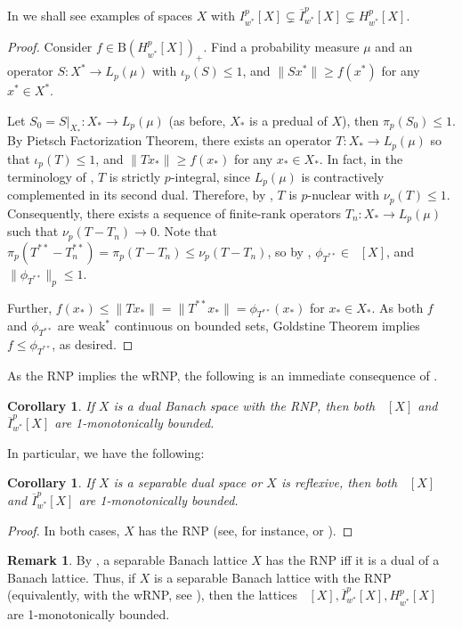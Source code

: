 \documentclass{amsart}
\theoremstyle{plain}
\newtheorem{corollary}[theorem]{Corollary}
\theoremstyle{definition}
\newtheorem{remark}[theorem]{Remark}
\numberwithin{equation}{section}
\newcommand{\ball}{\mathrm{B}}
\DeclareMathOperator{\FBLp}{FBL^{\mathit{(p)}}}
\newcommand{\Hp}{H_{w^*}^{p}}
\newcommand{\nip}{I_{w^*}^{p}}
\newcommand{\Ip}{\overline{I}_{w^*}^{p}}
\begin{document}
In  we shall see examples of spaces $X$ with $\nip[X] \subsetneq \Ip[X] \subsetneq \Hp[X]$.

\begin{proof}
 Consider $f \in \ball(\Hp[X])_+$. Find a probability measure $\mu$ and an operator $S : X^* \to L_p(\mu)$ with $\iota_p(S) \leq 1$, and $\|S x^*\| \geq f(x^*)$ for any $x^* \in X^*$.
 
 Let $S_0 = S|_{X_*} : X_* \to L_p(\mu)$ (as before, $X_*$ is a predual of $X$), then $\pi_p(S_0) \leq 1$. By Pietsch Factorization Theorem, there exists an operator $T : X_* \to L_p(\mu)$ so that $\iota_p(T) \leq 1$, and $\|Tx_*\| \geq f(x_*)$ for any $x_* \in X_*$. In fact, in the terminology of \cite{Car}, $T$ is strictly $p$-integral, since $L_p(\mu)$ is contractively complemented in its second dual. 
 Therefore, by \cite[Theorem II.4]{Car}, $T$ is $p$-nuclear with $\nu_p(T) \leq 1$. Consequently, there exists a sequence of finite-rank operators $T_n: X_* \to L_p(\mu)$ such that $\nu_p(T - T_n) \to 0$. Note that $\pi_p(T^{**} - T_n^{**}) = \pi_p(T - T_n) \leq \nu_p(T - T_n)$, so by , $\phi_{T^{**}} \in \FBLp[X]$, and $\|\phi_{T^{**}}\|_p \leq 1$.
 
  Further, $f(x_*) \leq \|T x_*\| = \|T^{**} x_*\| = \phi_{T^{**}}(x_*)$ for $x_* \in X_*$. As both $f$ and $\phi_{T^{**}}$ are weak$^*$ continuous on bounded sets, Goldstine Theorem implies $f \leq \phi_{T^{**}}$, as desired.
\end{proof}

As the RNP implies  the wRNP, the following is an immediate consequence of .
\begin{corollary}\label{dual-with-RNP}
 If $X$ is a dual Banach space with the RNP, then both $\FBLp[X]$ and $\Ip[X]$ are 1-monotonically bounded.
\end{corollary}

In particular, we have the following:

\begin{corollary}\label{good cases}
If $X$ is a separable dual space or $X$ is reflexive, then both $\FBLp[X]$ and $\Ip[X]$ are 1-monotonically bounded.
\end{corollary}

\begin{proof}
In both cases, $X$ has the RNP (see, for instance, \cite{DU} or \cite[Chapter 5]{BL}).
\end{proof}

\begin{remark}\label{lattice case}
By \cite[Corollary 5.4.21]{M-N}, a separable Banach lattice $X$ has the RNP iff it is a dual of a Banach lattice. Thus, if $X$ is a separable Banach lattice with the RNP (equivalently, with the wRNP, see \cite{GS}), then the lattices $\FBLp[X], \Ip[X], \Hp[X]$ are 1-monotonically bounded.
\end{remark}
\end{document}
